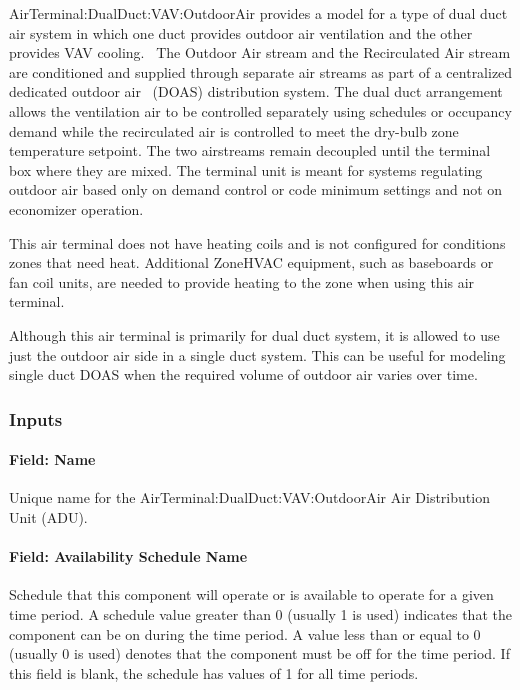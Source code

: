 AirTerminal:DualDuct:VAV:OutdoorAir provides a model for a type of dual duct air system in which one duct provides outdoor air ventilation and the other provides VAV cooling.~ The Outdoor Air stream and the Recirculated Air stream are conditioned and supplied through separate air streams as part of a centralized dedicated outdoor air~ (DOAS) distribution system. The dual duct arrangement allows the ventilation air to be controlled separately using schedules or occupancy demand while the recirculated air is controlled to meet the dry-bulb zone temperature setpoint. The two airstreams remain decoupled until the terminal box where they are mixed. The terminal unit is meant for systems regulating outdoor air based only on demand control or code minimum settings and not on economizer operation.

This air terminal does not have heating coils and is not configured for conditions zones that need heat. Additional ZoneHVAC equipment, such as baseboards or fan coil units, are needed to provide heating to the zone when using this air terminal.

Although this air terminal is primarily for dual duct system, it is allowed to use just the outdoor air side in a single duct system. This can be useful for modeling single duct DOAS when the required volume of outdoor air varies over time.

\subsubsection{Inputs}\label{inputs-16-000}

\paragraph{Field: Name}\label{field-name-16}

Unique name for the AirTerminal:DualDuct:VAV:OutdoorAir Air Distribution Unit (ADU).

\paragraph{Field: Availability Schedule Name}\label{field-availability-schedule-name-13}

Schedule that this component will operate or is available to operate for a given time period. A schedule value greater than 0 (usually 1 is used) indicates that the component can be on during the time period. A value less than or equal to 0 (usually 0 is used) denotes that the component must be off for the time period. If this field is blank, the schedule has values of 1 for all time periods.

